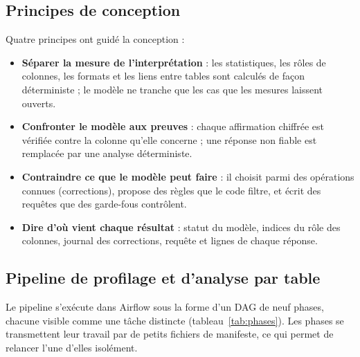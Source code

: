 \subsection{Principes de conception}

Quatre principes ont guidé la conception :
\begin{itemize}
  \item \textbf{Séparer la mesure de l'interprétation} : les statistiques, les rôles de colonnes, les formats et les liens entre tables sont calculés de façon déterministe ; le modèle ne tranche que les cas que les mesures laissent ouverts.
  \item \textbf{Confronter le modèle aux preuves} : chaque affirmation chiffrée est vérifiée contre la colonne qu'elle concerne ; une réponse non fiable est remplacée par une analyse déterministe.
  \item \textbf{Contraindre ce que le modèle peut faire} : il choisit parmi des opérations connues (corrections), propose des règles que le code filtre, et écrit des requêtes que des garde-fous contrôlent.
  \item \textbf{Dire d'où vient chaque résultat} : statut du modèle, indices du rôle des colonnes, journal des corrections, requête et lignes de chaque réponse.
\end{itemize}

\subsection{Pipeline de profilage et d'analyse par table}

Le pipeline s'exécute dans Airflow sous la forme d'un DAG de neuf phases, chacune visible comme une tâche distincte (tableau~\ref{tab:phases}). Les phases se transmettent leur travail par de petits fichiers de manifeste, ce qui permet de relancer l'une d'elles isolément.

